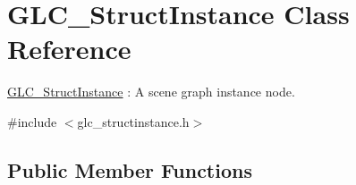 \hypertarget{class_g_l_c___struct_instance}{\section{G\-L\-C\-\_\-\-Struct\-Instance Class Reference}
\label{class_g_l_c___struct_instance}
}


\hyperlink{class_g_l_c___struct_instance}{G\-L\-C\-\_\-\-Struct\-Instance} \-: A scene graph instance node.  




{\ttfamily \#include $<$glc\-\_\-structinstance.\-h$>$}

\subsection*{Public Member Functions}
